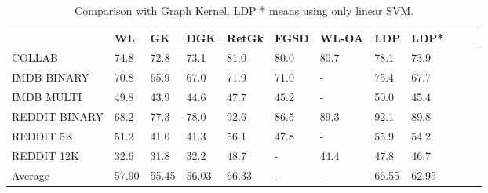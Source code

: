 \documentclass[11pt,onecolumn]{article}
\newcommand{\DOM}       {{LDP}\xspace}
\begin{document}
\begin{table}[]
\label{tab: t2}
\centering
\begin{tabular}{@{}llllllllllll@{}}
\toprule
                      & WL                & GK                & DGK      & RetGk     & FGSD       & WL-OA    & \DOM{}  &\DOM{}*\\ \midrule
COLLAB        & 74.8           & 72.8         & 73.1      & 81.0     & 80.0             & 80.7     & 78.1            &73.9 \\
IMDB BINARY   & 70.8         & 65.9         & 67.0      & 71.9     & 71.0               & -              & 75.4          & 67.7 \\
IMDB MULTI    & 49.8             & 43.9         & 44.6      & 47.7     & 45.2            & -              & 50.0            & 45.4 \\
REDDIT BINARY & 68.2         & 77.3         & 78.0     & 92.6     & 86.5            & 89.3        & 92.1          & 89.8 \\
REDDIT 5K     & 51.2              & 41.0         & 41.3      & 56.1     & 47.8           & -              & 55.9           & 54.2 \\
REDDIT 12K    & 32.6         & 31.8         & 32.2      & 48.7     & -                 & 44.4      & 47.8         & 46.7 \\ \midrule
Average        & 57.90        & 55.45        & 56.03    & 66.33    & -            & -         & 66.55        & 62.95\\ \bottomrule
\end{tabular}
\caption{Comparison with Graph Kernel. LDP * means using only linear SVM.}
\end{table}
\end{document}
